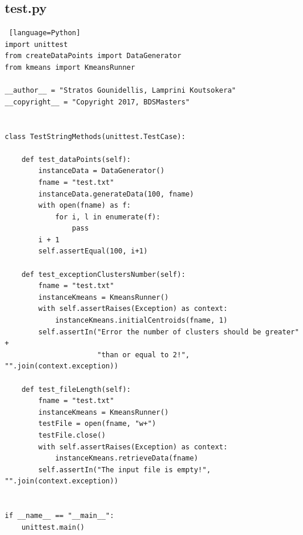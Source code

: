 \documentclass[11pt]{article}
\begin{document}
\subsection{test.py}\label{test.py}
\begin{lstlisting} [language=Python]
import unittest
from createDataPoints import DataGenerator
from kmeans import KmeansRunner

__author__ = "Stratos Gounidellis, Lamprini Koutsokera"
__copyright__ = "Copyright 2017, BDSMasters"


class TestStringMethods(unittest.TestCase):

    def test_dataPoints(self):
        instanceData = DataGenerator()
        fname = "test.txt"
        instanceData.generateData(100, fname)
        with open(fname) as f:
            for i, l in enumerate(f):
                pass
        i + 1
        self.assertEqual(100, i+1)

    def test_exceptionClustersNumber(self):
        fname = "test.txt"
        instanceKmeans = KmeansRunner()
        with self.assertRaises(Exception) as context:
            instanceKmeans.initialCentroids(fname, 1)
        self.assertIn("Error the number of clusters should be greater" +
                      "than or equal to 2!", "".join(context.exception))

    def test_fileLength(self):
        fname = "test.txt"
        instanceKmeans = KmeansRunner()
        testFile = open(fname, "w+")
        testFile.close()
        with self.assertRaises(Exception) as context:
            instanceKmeans.retrieveData(fname)
        self.assertIn("The input file is empty!", "".join(context.exception))


if __name__ == "__main__":
    unittest.main()

\end{lstlisting}

{} 
\end{document}
